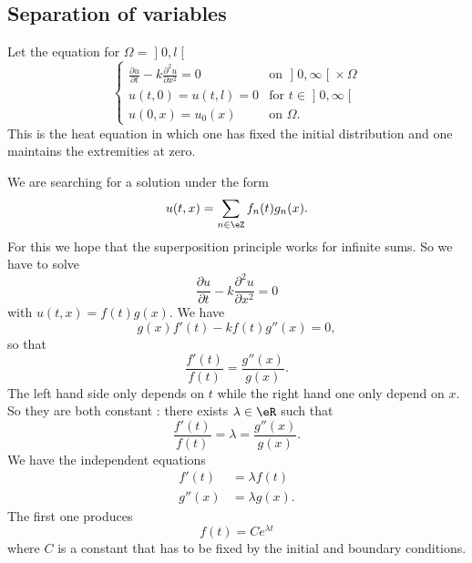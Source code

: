 \subsection{Separation of variables}

Let the equation for \( \Omega=\mathopen] 0 , l \mathclose[\)
\begin{equation}
     \begin{cases}
         \frac{ \partial u }{ \partial t }-k\frac{ \partial^2u }{ \partial x^2 }=0    &   \text{on } \mathopen] 0 , \infty \mathclose[\times \Omega\\
         u(t,0)=u(t,l)=0    &    \text{for }t\in\mathopen] 0 , \infty \mathclose[ \\
         u(0,x)=u_0(x)    &    \text{on }\Omega.  
     \end{cases}
\end{equation}
This is the heat equation in which one has fixed the initial distribution and one maintains the extremities at zero.

We are searching for a solution under the form
\begin{equation}
    u(t,x)=\sum_{n\in \eZ}f_n(t)g_n(x).
\end{equation}
For this we hope that the superposition principle works for infinite sums. So we have to solve
\begin{equation}
    \frac{ \partial u }{ \partial t }-k\frac{ \partial^2u }{ \partial x^2 }=0
\end{equation}
with \( u(t,x)=f(t)g(x)\). We have
\begin{equation}
    g(x)f'(t)-kf(t)g''(x)=0,
\end{equation}
so that
\begin{equation}
    \frac{ f'(t) }{ f(t) }=\frac{ g''(x) }{ g(x) }.
\end{equation}
The left hand side only depends on \( t\) while the right hand one only depend on \( x\). So they are both constant : there exists \( \lambda\in \eR\) such that
\begin{equation}
    \frac{ f'(t) }{ f(t) }=\lambda=\frac{ g''(x) }{ g(x) }.
\end{equation}
We have the independent equations
\begin{subequations}
    \begin{align}
        f'(t)&=\lambda f(t)\\
        g''(x)&=\lambda g(x).
    \end{align}
\end{subequations}
The first one produces
\begin{equation}
    f(t)=C e^{\lambda t}
\end{equation}
where \( C\) is a constant that has to be fixed by the initial and boundary conditions.

